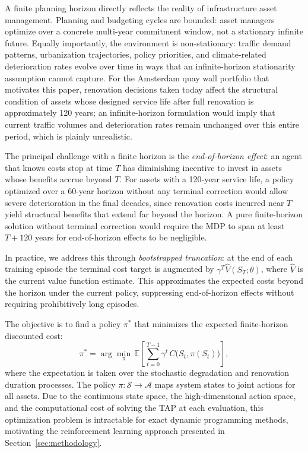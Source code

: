 \documentclass[3p, twocolumn]{elsarticle}
\begin{document}
A finite planning horizon directly reflects the reality of infrastructure asset management. Planning and budgeting cycles are bounded: asset managers optimize over a concrete multi-year commitment window, not a stationary infinite future. Equally importantly, the environment is non-stationary: traffic demand patterns, urbanization trajectories, policy priorities, and climate-related deterioration rates evolve over time in ways that an infinite-horizon stationarity assumption cannot capture. For the Amsterdam quay wall portfolio that motivates this paper, renovation decisions taken today affect the structural condition of assets whose designed service life after full renovation is approximately 120 years; an infinite-horizon formulation would imply that current traffic volumes and deterioration rates remain unchanged over this entire period, which is plainly unrealistic.

The principal challenge with a finite horizon is the \emph{end-of-horizon effect}: an agent that knows costs stop at time $T$ has diminishing incentive to invest in assets whose benefits accrue beyond $T$. For assets with a 120-year service life, a policy optimized over a 60-year horizon without any terminal correction would allow severe deterioration in the final decades, since renovation costs incurred near $T$ yield structural benefits that extend far beyond the horizon. A pure finite-horizon solution without terminal correction would require the MDP to span at least $T + 120$ years for end-of-horizon effects to be negligible.

In practice, we address this through \emph{bootstrapped truncation}: at the end of each training episode the terminal cost target is augmented by $\gamma^T \hat{V}(S_T; \theta)$, where $\hat{V}$ is the current value function estimate. This approximates the expected costs beyond the horizon under the current policy, suppressing end-of-horizon effects without requiring prohibitively long episodes.

The objective is to find a policy $\pi^*$ that minimizes the expected finite-horizon discounted cost:
\begin{equation}
    \pi^* = \arg\min_{\pi} \, \mathbb{E} \left[ \sum_{t=0}^{T-1} \gamma^t \, C\big(S_t, \pi(S_t)\big) \right],
    \label{eq:objective}
\end{equation}
where the expectation is taken over the stochastic degradation and renovation duration processes. The policy $\pi: \mathcal{S} \rightarrow \mathcal{A}$ maps system states to joint actions for all assets. Due to the continuous state space, the high-dimensional action space, and the computational cost of solving the TAP at each evaluation, this optimization problem is intractable for exact dynamic programming methods, motivating the reinforcement learning approach presented in Section~\ref{sec:methodology}.
\end{document}
